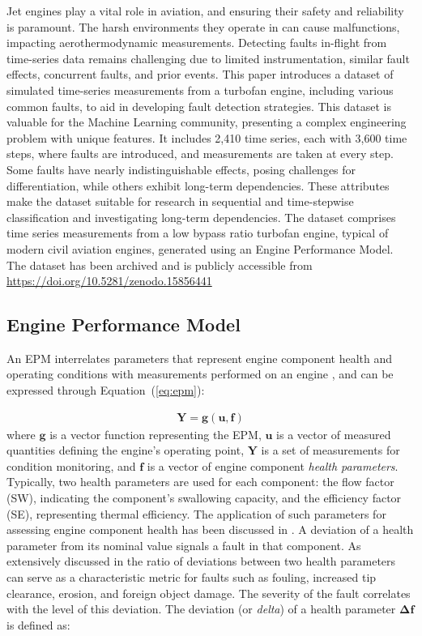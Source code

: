 \documentclass[twocolumn]{ceurart}
\begin{document}
Jet engines play a vital role in aviation, and ensuring their safety and reliability is paramount. The harsh environments they operate in can cause malfunctions, impacting aerothermodynamic measurements. Detecting faults in-flight from time-series data remains challenging due to limited instrumentation, similar fault effects, concurrent faults, and prior events. This paper introduces a dataset of simulated time-series measurements from a turbofan engine, including various common faults, to aid in developing fault detection strategies. This dataset is valuable for the Machine Learning community, presenting a complex engineering problem with unique features. It includes 2{,}410 time series, each with 3{,}600 time steps, where faults are introduced, and measurements are taken at every step. Some faults have nearly indistinguishable effects, posing challenges for differentiation, while others exhibit long-term dependencies. These attributes make the dataset suitable for research in sequential and time-stepwise classification and investigating long-term dependencies. The dataset comprises time series measurements from a low bypass ratio turbofan engine, typical of modern civil aviation engines, generated using an Engine Performance Model.
The dataset has been archived and is publicly accessible from \url{https://doi.org/10.5281/zenodo.15856441}


\subsection{Engine Performance Model}

An EPM interrelates parameters that represent engine component health and operating conditions with measurements performed on an engine \citep{alexiou_development_2005}, and can be expressed through Equation~(\ref{eq:epm}):

\begin{eqnarray}\label{eq:epm}
\mathbf{Y} = \mathbf{g}(\mathbf{u}, \mathbf{f})
\end{eqnarray}
%
where $\mathbf{g}$ is a vector function representing the EPM, $\mathbf{u}$ is a vector of measured 
quantities defining the engine's operating point, $\mathbf{Y}$ is a set of measurements for condition monitoring, and $\mathbf{f}$ is a vector of engine component \textit{health parameters}. Typically, two health parameters are used for each component: the flow factor (SW), indicating the component's swallowing capacity, and the efficiency factor (SE), representing thermal efficiency. The application of such parameters for assessing engine component health has been discussed in \citep{mathioudakis_performance_2001}. A deviation of a health parameter from its nominal value signals a fault in that component. As extensively discussed in \citep{mathioudakis_signatures_2024} the ratio of deviations between two health parameters can serve as a characteristic metric for faults such as fouling, increased tip clearance, erosion, and foreign object damage. The severity of the fault correlates with the level of this deviation. The deviation (or \textit{delta}) of a health parameter $\mathbf{\Delta f}$ is defined as:
\end{document}
